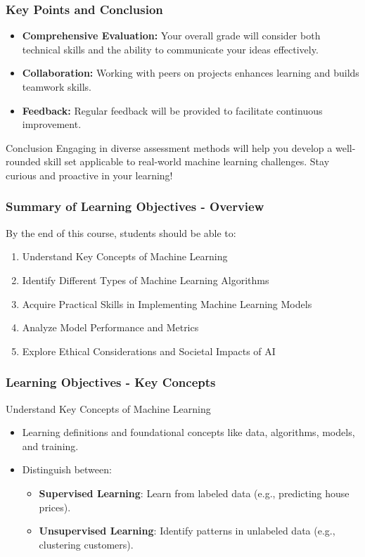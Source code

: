 \documentclass[aspectratio=169]{beamer}
\begin{document}
\begin{frame}[fragile]
    \frametitle{Key Points and Conclusion}
    \begin{itemize}
        \item \textbf{Comprehensive Evaluation:} Your overall grade will consider both technical skills and the ability to communicate your ideas effectively.
        \item \textbf{Collaboration:} Working with peers on projects enhances learning and builds teamwork skills.
        \item \textbf{Feedback:} Regular feedback will be provided to facilitate continuous improvement.
    \end{itemize}
    
    \begin{block}{Conclusion}
        Engaging in diverse assessment methods will help you develop a well-rounded skill set applicable to real-world machine learning challenges. Stay curious and proactive in your learning!
    \end{block}
\end{frame}

\begin{frame}[fragile]
    \frametitle{Summary of Learning Objectives - Overview}
    By the end of this course, students should be able to:
    \begin{enumerate}
        \item Understand Key Concepts of Machine Learning
        \item Identify Different Types of Machine Learning Algorithms
        \item Acquire Practical Skills in Implementing Machine Learning Models
        \item Analyze Model Performance and Metrics
        \item Explore Ethical Considerations and Societal Impacts of AI
    \end{enumerate}
\end{frame}

\begin{frame}[fragile]
    \frametitle{Learning Objectives - Key Concepts}
    \begin{block}{Understand Key Concepts of Machine Learning}
        \begin{itemize}
            \item Learning definitions and foundational concepts like data, algorithms, models, and training.
            \item Distinguish between:
                \begin{itemize}
                    \item \textbf{Supervised Learning}: Learn from labeled data (e.g., predicting house prices).
                    \item \textbf{Unsupervised Learning}: Identify patterns in unlabeled data (e.g., clustering customers).
                \end{itemize}
        \end{itemize}
    \end{block}
\end{frame}
\end{document}
